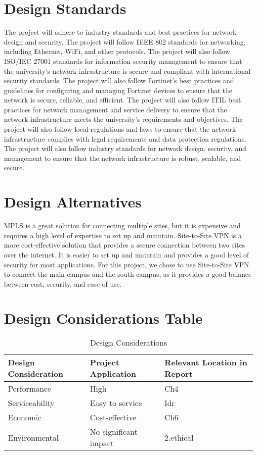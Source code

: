 \documentclass[12pt]{report}
\begin{document}
\section{Design Standards}
The project will adhere to industry standards and best practices for network design and security. The project will follow IEEE 802 standards for networking, including Ethernet, WiFi, and other protocols. The project will also follow ISO/IEC 27001 standards for information security management to ensure that the university's network infrastructure is secure and compliant with international security standards. The project will also follow Fortinet's best practices and guidelines for configuring and managing Fortinet devices to ensure that the network is secure, reliable, and efficient. The project will also follow ITIL best practices for network management and service delivery to ensure that the network infrastructure meets the university's requirements and objectives. The project will also follow local regulations and laws to ensure that the network infrastructure complies with legal requirements and data protection regulations. The project will also follow industry standards for network design, security, and management to ensure that the network infrastructure is robust, scalable, and secure. %

\section{Design Alternatives}
MPLS is a great solution for connecting multiple sites, but it is expensive and requires a high level of expertise to set up and maintain. Site-to-Site VPN is a more cost-effective solution that provides a secure connection between two sites over the internet. It is easier to set up and maintain and provides a good level of security for most applications. For this project, we chose to use Site-to-Site VPN to connect the main campus and the south campus, as it provides a good balance between cost, security, and ease of use.

\section{Design Considerations Table}
\begin{table}[h]
    \centering
    \begin{tabular}{|>{\centering\arraybackslash}m{5cm}|>{\centering\arraybackslash}m{5cm}|>{\centering\arraybackslash}m{5cm}|}
        \hline
        \textbf{Design Consideration} & \textbf{Project Application} & \textbf{Relevant Location in Report} \\
        \hline
        Performance & High & Ch4 \\
        \hline
        Serviceability & Easy to service & Idr \\
        \hline
        Economic & Cost-effective & Ch6 \\
        \hline
        Environmental & No significant impact & 2.ethical \\
        \hline
    \end{tabular}
    \caption{Design Considerations}
    \label{tab:design_considerations}
\end{table}
\end{document}
